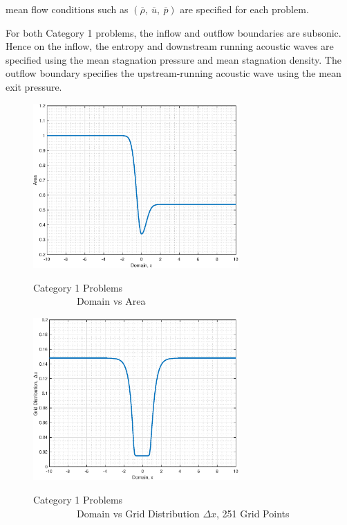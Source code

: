 \documentclass[conf]{new-aiaa}
\begin{document}
mean flow conditions such as $\left(\overline{\rho},~\overline{u},~\overline{p} \right)$ are specified for each problem. 

For both Category 1 problems, the inflow and outflow boundaries are subsonic. 
Hence on the inflow, the entropy and downstream running acoustic waves are specified using the mean stagnation pressure and mean stagnation density.
The outflow boundary specifies the upstream-running acoustic wave using the mean exit pressure. 

\begin{figure}[hbtp!]
	\centering
{\includegraphics[width=0.7\textwidth]{Figures/Area}}
  	\caption{Category 1 Problems \\ ~~~~~~~~~Domain vs Area}
  	\label{fig:Domain_Area}
\end{figure}

\begin{figure}[hbtp!]
	\centering
{\includegraphics[width=0.7\textwidth]{Figures/DX}}
  	\caption{Category 1 Problems \\ ~~~~~~~~~Domain vs Grid Distribution $\Delta{x}$, 251 Grid Points}
  	\label{fig:Domain_Deltax}
\end{figure}
\end{document}
